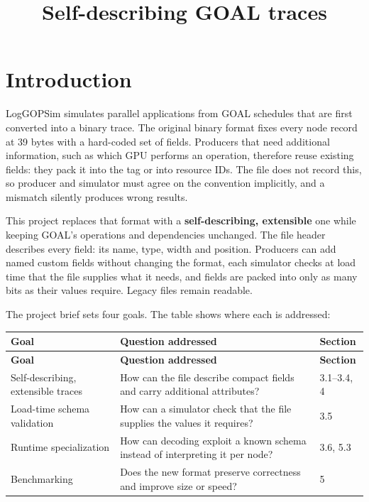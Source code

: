 \documentclass[10pt,a4paper]{article}
\title{Self-describing GOAL traces}
\author{}
\date{}
\begin{document}
\maketitle
\setcounter{tocdepth}{2}
\tableofcontents
\clearpage

\hypertarget{introduction}{}
\section{Introduction}

LogGOPSim simulates parallel applications from GOAL schedules that are first converted into a binary trace. The original binary format fixes every node record at 39 bytes with a hard-coded set of fields. Producers that need additional information, such as which GPU performs an operation, therefore reuse existing fields: they pack it into the tag or into resource IDs. The file does not record this, so producer and simulator must agree on the convention implicitly, and a mismatch silently produces wrong results.

This project replaces that format with a \textbf{self-describing, extensible} one while keeping GOAL's operations and dependencies unchanged. The file header describes every field: its name, type, width and position. Producers can add named custom fields without changing the format, each simulator checks at load time that the file supplies what it needs, and fields are packed into only as many bits as their values require. Legacy files remain readable.

The project brief sets four goals. The table shows where each is addressed:

{\small
\begin{longtable}{P{0.3\dimexpr{}\tabcolsep\relax}P{0.58\dimexpr{}\tabcolsep\relax}P{0.12\dimexpr{}\tabcolsep\relax}}
\toprule
\textbf{Goal} & \textbf{Question addressed} & \textbf{Section} \\
\midrule
\endfirsthead
\toprule
\textbf{Goal} & \textbf{Question addressed} & \textbf{Section} \\
\midrule
\endhead
\bottomrule
\endfoot
Self-describing, extensible traces & How can the file describe compact fields and carry additional attributes? & 3.1--3.4, 4 \\
Load-time schema validation & How can a simulator check that the file supplies the values it requires? & 3.5 \\
Runtime specialization & How can decoding exploit a known schema instead of interpreting it per node? & 3.6, 5.3 \\
Benchmarking & Does the new format preserve correctness and improve size or speed? & 5 \\
\end{longtable}
}
\end{document}
